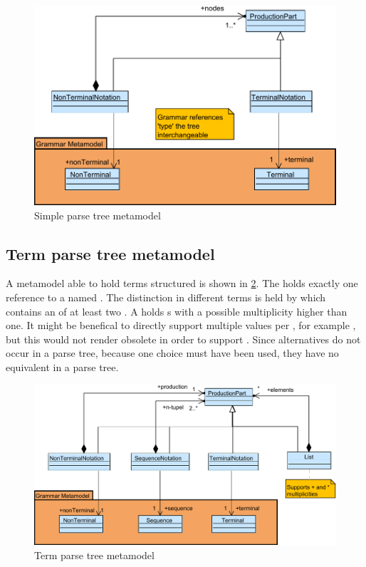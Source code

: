 \begin{figure}
\centering
\includegraphics[scale=0.75]{gfx/ex/Notation_ParseTree} 
\caption{Simple parse tree metamodel}
\label{MM:Not:PT}
\end{figure}

\subsection{Term parse tree metamodel}A metamodel able to hold terms structured is shown in \ref{MM:Not:TT}. The  holds exactly one reference to a  named . The distinction in different terms is held by  which contains an  of at least two . A  holds s with a possible multiplicity higher than one. It might be benefical to directly support multiple values per , for example , but this would not render  obsolete in order to support . Since alternatives do not occur in a parse tree, because one choice must have been used, they have no equivalent in a parse tree. 

\begin{figure}
\centering
\includegraphics[scale=0.75]{gfx/ex/Notation_TermTree} 
\caption{Term parse tree metamodel}
\label{MM:Not:TT}
\end{figure}

